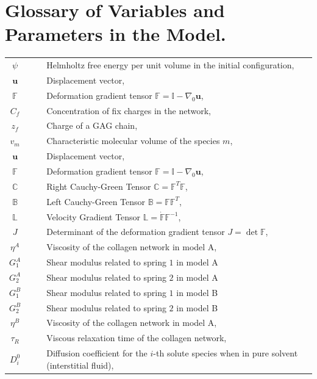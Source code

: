 \documentclass[runningheads]{llncs}
\newcommand{\F}{\ensuremath{\mathbb{F}}}
\newcommand{\LL}{\ensuremath{\mathbb{L}}}
\begin{document}
%


\newpage
\appendix
\section{Glossary of Variables and Parameters in the Model.}
\begin{table}[h!]
\begin{tabular}{c  l}
	$\psi\qquad $ & Helmholtz free energy per unit volume in the initial configuration,\\
	$\mathbf{u}\qquad$ & Displacement vector,\\
	$\F\qquad$ & Deformation gradient tensor $\F=\mathbb{I}-\nabla_0\mathbf{u}$,\\
	$C_f\qquad$ & Concentration of fix charges in the network,\\
	$z_f\qquad$ & Charge of a GAG chain,\\
	$v_m\qquad$ & Characteristic molecular volume of the species $m$,\\
	$\mathbf{u}\qquad$ & Displacement vector,\\
	$\F\qquad$ & Deformation gradient tensor $\F=\mathbb{I}-\nabla_0\mathbf{u}$,\\	
	$\mathbb{C}\qquad$ & Right Cauchy-Green Tensor $\mathbb{C}=\F^T\F$,\\
	$\mathbb{B}\qquad$ & Left Cauchy-Green Tensor $\mathbb{B}=\F\F^T$,\\
	$\LL\qquad$ & Velocity Gradient Tensor $\LL=\dot{\F}\F^{-1}$,\\
	$J\qquad$ & Determinant of the deformation gradient tensor $J=\det \F$,\\
	$\eta^A\qquad $ & Viscosity of the collagen network in model A,\\
	$G^A_1\qquad$ & Shear modulus related to spring $1$ in model A\\
	$G^A_2\qquad$ & Shear modulus related to spring $2$ in model A\\
	$G^B_1\qquad$ & Shear modulus related to spring $1$ in model B\\
	$G^B_2\qquad$ & Shear modulus related to spring $2$ in model B\\
	$\eta^B\qquad$ & Viscosity of the collagen network in model A,\\
	$\tau_R\qquad$ & Viscous relaxation time of the collagen network,\\
	$D^0_i\qquad$ & Diffusion coefficient for the $i$-th solute species when in pure solvent (interstitial fluid),\\

\end{tabular}
\end{table}
\end{document}
